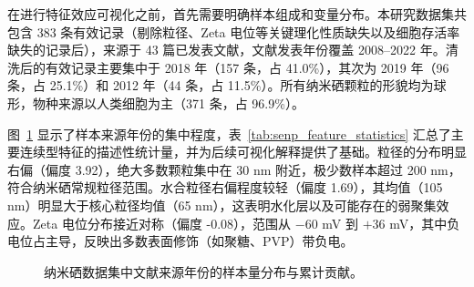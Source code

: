 \documentclass[letterpaper]{article}
\begin{document}
在进行特征效应可视化之前，首先需要明确样本组成和变量分布。本研究数据集共包含 383 条有效记录（剔除粒径、Zeta 电位等关键理化性质缺失以及细胞存活率缺失的记录后），来源于 43 篇已发表文献，文献发表年份覆盖 2008--2022 年。清洗后的有效记录主要集中于 2018 年（157 条，占 41.0\%），其次为 2019 年（96 条，占 25.1\%）和 2012 年（44 条，占 11.5\%）。所有纳米硒颗粒的形貌均为球形，物种来源以人类细胞为主（371 条，占 96.9\%）。

图~\ref{fig:senp-year-distribution} 显示了样本来源年份的集中程度，表~\ref{tab:senp_feature_statistics} 汇总了主要连续型特征的描述性统计量，并为后续可视化解释提供了基础。粒径的分布明显右偏（偏度 3.92），绝大多数颗粒集中在 30 nm 附近，极少数样本超过 200 nm，符合纳米硒常规粒径范围。水合粒径右偏程度较轻（偏度 1.69），其均值（105 nm）明显大于核心粒径均值（65 nm），这表明水化层以及可能存在的弱聚集效应。Zeta 电位分布接近对称（偏度 -0.08），范围从 $-60$ mV 到 $+36$ mV，其中负电位占主导，反映出多数表面修饰（如聚糖、PVP）带负电。

\begin{figure}[H]
  \centering
  \begin{minipage}{0.48\linewidth}
    \centering
  \end{minipage}
  \hfill
  \begin{minipage}{0.48\linewidth}
    \centering
  \end{minipage}
  \caption{纳米硒数据集中文献来源年份的样本量分布与累计贡献。}
  \label{fig:senp-year-distribution}
\end{figure}
\end{document}
